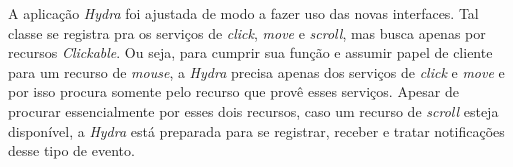 A aplicação \emph{Hydra} foi ajustada de modo a fazer uso das novas interfaces. Tal classe se registra pra os serviços de \emph{click}, \emph{move} e \emph{scroll}, mas busca apenas por recursos \emph{Clickable}. Ou seja, para cumprir sua função e assumir papel de cliente para um recurso de \emph{mouse}, a \emph{Hydra} precisa apenas dos serviços de \emph{click} e \emph{move} e por isso procura somente pelo recurso que provê esses serviços. Apesar de procurar essencialmente por esses dois recursos, caso um recurso de \emph{scroll} esteja disponível, a \emph{Hydra} está preparada para se registrar, receber e tratar notificações desse tipo de evento.
 
